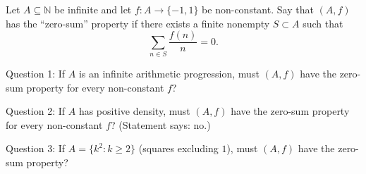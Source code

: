 Let $A\subseteq\mathbb{N}$ be infinite and let $f:A\to\{-1,1\}$ be non-constant.
Say that $(A,f)$ has the “zero-sum” property if there exists a finite nonempty $S\subset A$ such that
\[\sum_{n\in S}\frac{f(n)}{n}=0.\tag{$\ast$}\]

Question 1: If $A$ is an infinite arithmetic progression, must $(A,f)$ have the zero-sum property for every non-constant $f$?

Question 2: If $A$ has positive density, must $(A,f)$ have the zero-sum property for every non-constant $f$? (Statement says: no.)

Question 3: If $A=\{k^2:k\ge 2\}$ (squares excluding $1$), must $(A,f)$ have the zero-sum property?

